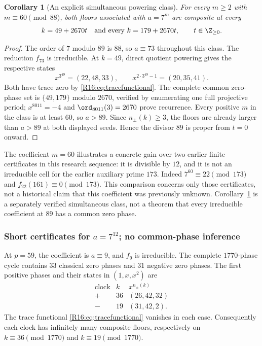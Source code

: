 \documentclass[11pt,a4paper]{article}
\newtheorem{corollary}[theorem]{Corollary}\newtheorem{mainthm}[theorem]{Theorem}
\theoremstyle{definition}\newtheorem{definition}[theorem]{Definition}
\theoremstyle{remark}\newtheorem{remark}[theorem]{Remark}
\begin{document}
\begin{corollary}[An explicit simultaneous powering class]\label{R16:cor:m60}
For every $m\ge2$ with $m\equiv60\pmod{88}$, both floors associated with
$a=7^m$ are composite at every
\[
 k=49+2670t\quad\text{and every }k=179+2670t,
 \qquad t\in\Z_{\ge0}.
\]
\end{corollary}
\begin{proof}
The order of $7$ modulo $89$ is $88$, so $a\equiv73$ throughout this
class. The reduction $f_{73}$ is irreducible. At $k=49$, direct quotient
powering gives the respective states
\[
 x^{3^{49}}=(22,48,33),\qquad
 x^{2\cdot3^{49}-1}=(20,35,41).
\]
Both have trace zero by \eqref{R16:eq:tracefunctional}. The complete common
zero-phase set is $\{49,179\}$ modulo $2670$, verified by enumerating
one full projective period; $x^{8011}=-4$ and
$\ord_{8011}(3)=2670$ prove recurrence. Every positive $m$ in the
class is at least $60$, so $a>89$. Since $n_\pm(k)\ge3$, the floors
are already larger than $a>89$ at both displayed seeds. Hence the divisor
$89$ is proper from $t=0$ onward.
\end{proof}

The coefficient $m=60$ illustrates a concrete gain over two earlier
finite certificates in this research sequence: it is divisible by $12$,
and it is not an irreducible cell for the earlier auxiliary prime $173$.
Indeed $7^{60}\equiv22\pmod{173}$ and $f_{22}(161)\equiv0\pmod{173}$.
This comparison concerns only those certificates, not a historical claim
that this coefficient was previously unknown. Corollary~\ref{R16:cor:m60}
is a separately verified simultaneous class, not a theorem that every
irreducible coefficient at $89$ has a common zero phase.

\subsubsection{Short certificates for \texorpdfstring{$a=7^{12}$}{a = 7 to the twelfth power}; no common-phase inference}

At $p=59$, the coefficient is $a\equiv9$, and $f_9$ is irreducible.
The complete $1770$-phase cycle contains $33$ classical zero phases and
$31$ negative zero phases. The first positive phases and their states in
$(1,x,x^2)$ are
\[
 \begin{array}{c|c|c}
 \text{clock}&k&x^{n_\pm(k)}\\\hline
 +&36&(26,42,32)\\
 -&19&(31,42,2).
 \end{array}
\]
The trace functional \eqref{R16:eq:tracefunctional} vanishes in each case.
Consequently each clock has infinitely many composite floors, respectively
on $k\equiv36\pmod{1770}$ and $k\equiv19\pmod{1770}$.
\end{document}
